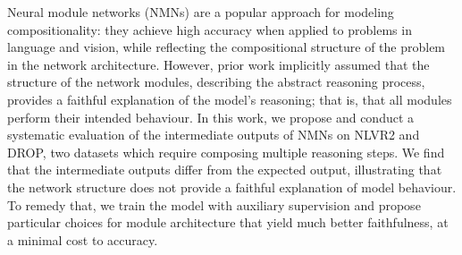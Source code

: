 Neural module networks (NMNs) are a popular approach for modeling compositionality: they achieve high accuracy when applied to problems in language and vision, while  reflecting the compositional structure of the problem in the network architecture. However, prior work implicitly assumed that the structure of the network modules, describing the abstract reasoning process, provides a faithful explanation of the model's reasoning; that is, that all modules perform their intended behaviour. In this work, we propose and conduct a systematic evaluation of the intermediate outputs of NMNs on NLVR2 and DROP, two datasets which require composing multiple reasoning steps. We find that the intermediate outputs differ from the expected output, illustrating that the network structure does not provide a faithful explanation of model behaviour. To remedy that, we train the model with auxiliary supervision and propose particular choices for module architecture that yield much better faithfulness, at a minimal cost to accuracy.
